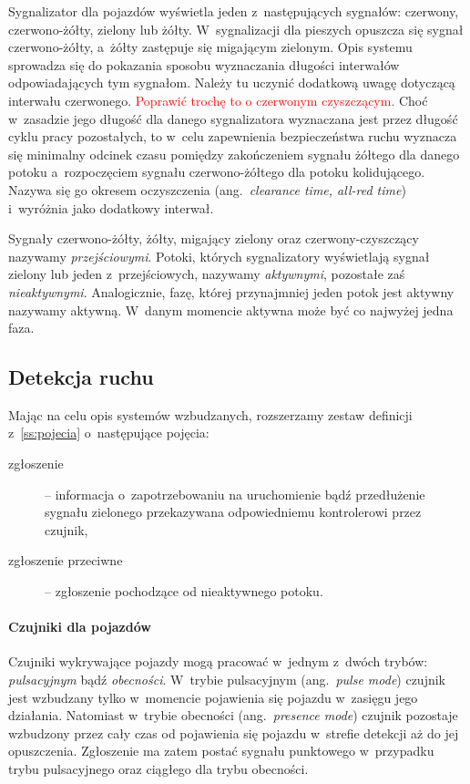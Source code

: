 \documentclass{pracamgr}
\newcommand{\ang}[1]{(ang.~\emph{#1})}
\newcommand{\todo}[1]{\textcolor{red}{#1}}
\theoremstyle{plain}
\begin{document}
Sygnalizator dla pojazdów wyświetla jeden z~następujących sygnałów:
czerwony, czerwono-żółty, zielony lub żółty. W~sygnalizacji dla
pieszych opuszcza się sygnał czerwono-żółty, a~żółty zastępuje się
migającym zielonym. Opis systemu sprowadza się do pokazania sposobu
wyznaczania długości interwałów odpowiadających tym sygnałom. Należy
tu uczynić dodatkową uwagę dotyczącą interwału
czerwonego. \todo{Poprawić trochę to o czerwonym czyszczącym.} Choć
w~zasadzie jego długość dla danego sygnalizatora wyznaczana jest przez
długość cyklu pracy pozostałych, to w~celu zapewnienia bezpieczeństwa
ruchu wyznacza się minimalny odcinek czasu pomiędzy zakończeniem
sygnału żółtego dla danego potoku a~rozpoczęciem sygnału
czerwono-żółtego dla potoku kolidującego. Nazywa się go okresem
oczyszczenia \ang{clearance time, all-red time} i~wyróżnia jako
dodatkowy interwał.

Sygnały czerwono-żółty, żółty, migający zielony oraz
czerwony-czyszczący nazywamy \emph{przejściowymi}. Potoki, których
sygnalizatory wyświetlają sygnał zielony lub jeden z~przejściowych,
nazywamy \emph{aktywnymi}, pozostałe zaś
\emph{nieaktywnymi}. Analogicznie, fazę, której przynajmniej jeden
potok jest aktywny nazywamy aktywną. W~danym momencie aktywna może być
co najwyżej jedna faza.

\subsection{Detekcja ruchu}
\label{ss:detekcja} Mając na celu opis systemów wzbudzanych,
rozszerzamy zestaw definicji z~\ref{ss:pojecia} o~następujące
pojęcia:
\begin{description}
  \item[zgłoszenie] -- informacja o~zapotrzebowaniu na uruchomienie
  bądź przedłużenie sygnału zielonego przekazywana odpowiedniemu
  kontrolerowi przez czujnik,
  \item[zgłoszenie przeciwne] -- zgłoszenie pochodzące od nieaktywnego
  potoku.
\end{description}

\paragraph{Czujniki dla pojazdów} Czujniki wykrywające pojazdy mogą
pracować w~jednym z~dwóch trybów: \emph{pulsacyjnym} bądź
\emph{obecności}.  W~trybie pulsacyjnym \ang{pulse mode} czujnik jest
wzbudzany tylko w~momencie pojawienia się pojazdu w~zasięgu jego
działania.  Natomiast w~trybie obecności \ang{presence mode} czujnik
pozostaje wzbudzony przez cały czas od pojawienia się pojazdu
w~strefie detekcji aż do jej opuszczenia. Zgłoszenie ma zatem postać
sygnału punktowego w~przypadku trybu pulsacyjnego oraz ciągłego dla
trybu obecności.
\end{document}
